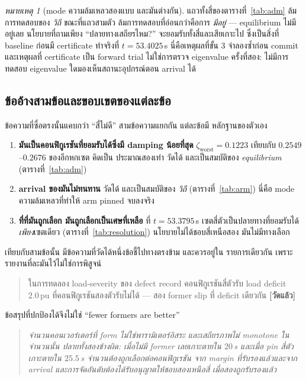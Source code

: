 \documentclass[12pt,a4paper]{article}
\theoremstyle{remark}
\newtheorem{remark}{หมายเหตุ}
\newcommand{\pu}{\,\mathrm{pu}}
\newcommand{\zworst}{\zeta_{\mathrm{worst}}}
\newcommand{\measured}{\textcolor{ok}{\textbf{[วัดแล้ว]}}}
\begin{document}
\begin{remark}[mode ความล้มเหลวสองแบบ และมันต่างกัน]
แถวทั้งสี่ของตารางที่~\ref{tab:adm} ล้มการทดสอบของ \emph{วิถี} ขณะที่แถวสามตัว
ล้มการทดสอบที่อ่อนกว่าคือการ \emph{มีอยู่} --- equilibrium ไม่มีอยู่เลย
นโยบายที่ถามเพียง ``ปลายทางเสถียรไหม?'' จะยอมรับทั้งสี่และเสียเกาะไป
ซึ่งเป็นสิ่งที่ baseline ก่อนมี certificate ทำจริงที่ $t=53.4025$\,s
นี่คือเหตุผลที่ขั้น 3 จำลองซ้ำก่อน commit และเหตุผลที่ certificate เป็น
forward trial ไม่ใช่การตรวจ eigenvalue ครั้งที่สอง: ไม่มีการทดสอบ eigenvalue
ใดมองเห็นสถานะอุปกรณ์ตอน arrival ได้
\end{remark}

\subsection{ข้ออ้างสามข้อและขอบเขตของแต่ละข้อ}

ข้อความที่ซื่อตรงนั้นแคบกว่า ``สี่ไม่ดี'' สามข้อความแยกกัน แต่ละข้อมี
หลักฐานของตัวเอง

\begin{enumerate}[leftmargin=1.9em,itemsep=3pt]
\item \textbf{มันเป็นคอนฟิกูเรชันที่ยอมรับได้ซึ่งมี damping น้อยที่สุด}
      $\zworst = 0.1223$ เทียบกับ $0.2549$--$0.2676$ ของอีกหกเซต คิดเป็น
      ประมาณสองเท่า วัดได้ และเป็นสมบัติของ \emph{equilibrium}
      (ตารางที่~\ref{tab:adm})
\item \textbf{arrival ของมันไม่ทนทาน} วัดได้ และเป็นสมบัติของ \emph{วิถี}
      (ตารางที่~\ref{tab:arm}) นี่คือ mode ความล้มเหลวที่ทำให้ arm pinned
      จบลงจริง
\item \textbf{ที่ที่มันถูกเลือก มันถูกเลือกเป็นเศษที่เหลือ} ที่ $t=53.3795$\,s
      เซตสี่ตัวเป็นปลายทางที่ยอมรับได้\emph{เพียง}เซตเดียว
      (ตารางที่~\ref{tab:resolution}) นโยบายไม่ได้ชอบสี่เหนือสอง
      มันไม่มีทางเลือก
\end{enumerate}

เทียบกับสามข้อนั้น มีข้อความที่วัดได้หนึ่งข้อชี้ไปทางตรงข้าม และควรอยู่ใน
รายการเดียวกัน เพราะรายงานที่ละมันไว้ไม่ใช่การพิสูจน์

\begin{quote}
ในการทดลอง load-severity ของ defect record คอนฟิกูเรชันสี่ตัวรับ load deficit
$2.0\pu$ ที่คอนฟิกูเรชันสองตัวรับไม่ได้ --- สอง former slip ที่ deficit เดียวกัน
\measured
\end{quote}

ข้อสรุปที่ปกป้องได้จึงไม่ใช่ ``fewer formers are better''

\begin{quote}\small\itshape
จำนวนคอนเวอร์เตอร์ที่ form ไม่ใช่พารามิเตอร์อิสระ และเสถียรภาพไม่ monotone
ในจำนวนนั้น ปลายทั้งสองข้างผิด: เมื่อไม่มี former เลยเกาะตายใน $20$\,s และเมื่อ
pin สี่ตัวเกาะตายใน $25.5$\,s จำนวนต้องถูกเลือกต่อคอนฟิกูเรชัน จาก margin
ที่รับรองแล้วและจาก arrival และการจัดอันดับต้องได้รับอนุญาตให้ชอบสองเหนือสี่
เมื่อสองถูกรับรองแล้ว
\end{quote}
\end{document}
